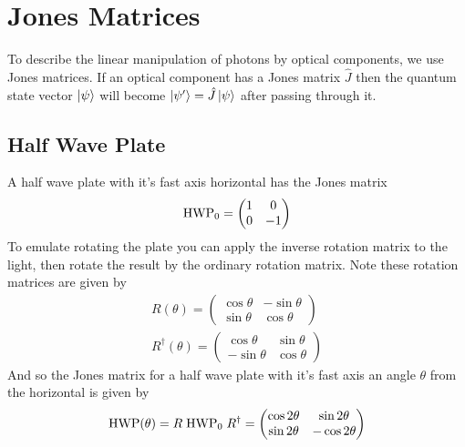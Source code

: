 \section{Jones Matrices}
	To describe the linear manipulation of photons by optical components, we use Jones matrices. If an optical component has a Jones matrix $\hat{J}$ then the quantum state vector $\ket{\psi}$ will become $\ket{\psi'}=\hat{J}\ket{\psi}$ after passing through it.
	
	\subsection{Half Wave Plate}
	A half wave plate with it's fast axis horizontal has the Jones matrix
	\begin{equation}
		\text{\rmfamily HWP\normalfont}_0=\begin{pmatrix}
			1 & 0 \\ 0 & -1
		\end{pmatrix}
	\end{equation}
	To emulate rotating the plate you can apply the inverse rotation matrix to the light, then rotate the result by the ordinary rotation matrix. Note these rotation matrices are given by
	\begin{align}
		R(\theta) = \begin{pmatrix}
			\cos\theta & -\sin\theta \\ \sin\theta & \cos\theta
		\end{pmatrix} \\
		R^\dagger(\theta) = \begin{pmatrix}
			\cos\theta & \sin\theta \\ -\sin\theta & \cos\theta
		\end{pmatrix}
	\end{align}
	And so the Jones matrix for a half wave plate with it's fast axis an angle $\theta$ from the horizontal is given by
	\begin{equation}
		\text{\rmfamily HWP\normalfont}(\theta) = R\;\text{\rmfamily HWP\normalfont}_0\;R^\dagger = \begin{pmatrix}
			\cos 2\theta & \sin 2\theta \\ \sin 2\theta & -\cos 2\theta
		\end{pmatrix}
	\end{equation}
	
